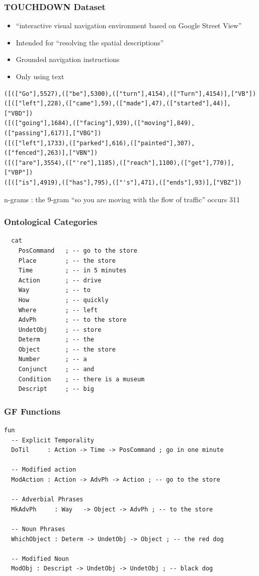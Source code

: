 \documentclass{beamer}
\begin{document}
\begin{frame}[fragile]
\frametitle{TOUCHDOWN Dataset}
\fontsize{8pt}{9pt}\selectfont
\begin{block}{}
\begin{itemize}[<+->]
\item ``interactive visual navigation environment based on Google Street View''
\item Intended for ``resolving the spatial descriptions''
\item Grounded navigation instructions
\item Only using text
\end{itemize}
\end{block}
\pause
\begin{verbatim}
([(["Go"],5527),(["be"],5300),(["turn"],4154),(["Turn"],4154)],["VB"])
([(["left"],228),(["came"],59),(["made"],47),(["started"],44)],["VBD"])
([(["going"],1684),(["facing"],939),(["moving"],849),(["passing"],617)],["VBG"])
([(["left"],1733),(["parked"],616),(["painted"],307),(["fenced"],263)],["VBN"])
([(["are"],3554),(["'re"],1185),(["reach"],1100),(["get"],770)],["VBP"])
([(["is"],4919),(["has"],795),(["'s"],471),(["ends"],93)],["VBZ"])
\end{verbatim}

\pause
\begin{exampleblock}{}
n-grams : the 9-gram ``so you are moving with the flow of traffic'' occurs 311
\end{exampleblock}

\end{frame}



\begin{frame}[fragile]
\frametitle{Ontological Categories}
\begin{verbatim}
  cat
    PosCommand   ; -- go to the store
    Place        ; -- the store
    Time         ; -- in 5 minutes
    Action       ; -- drive
    Way          ; -- to
    How          ; -- quickly
    Where        ; -- left
    AdvPh        ; -- to the store
    UndetObj     ; -- store
    Determ       ; -- the
    Object       ; -- the store
    Number       ; -- a
    Conjunct     ; -- and
    Condition    ; -- there is a museum
    Descript     ; -- big
\end{verbatim}
\end{frame}

\begin{frame}[fragile]
\frametitle{GF Functions}
\begin{verbatim}
fun
  -- Explicit Temporality
  DoTil     : Action -> Time -> PosCommand ; go in one minute

  -- Modified action
  ModAction : Action -> AdvPh -> Action ; -- go to the store

  -- Adverbial Phrases
  MkAdvPh     : Way   -> Object -> AdvPh ; -- to the store

  -- Noun Phrases
  WhichObject : Determ -> UndetObj -> Object ; -- the red dog

  -- Modified Noun
  ModObj : Descript -> UndetObj -> UndetObj ; -- black dog
\end{verbatim}
\end{frame}
\end{document}
